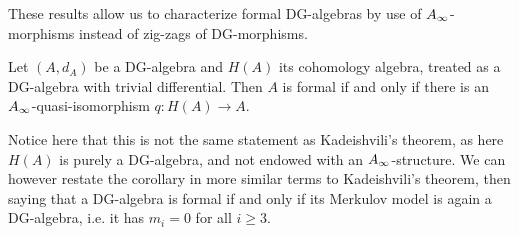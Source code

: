 These results allow us to characterize formal DG-algebras by use of $A_{\infty}$-morphisms instead of zig-zags of DG-morphisms. 


\begin{corollary}
\label{cor:formal_A_infinity-qi}
Let $(A, d_A)$ be a DG-algebra and $H(A)$ its cohomology algebra, treated as a DG-algebra with trivial differential. Then $A$ is formal if and only if there is an $A_{\infty}$-quasi-isomorphism $q\colon H(A)\longrightarrow A$. 
\end{corollary}

Notice here that this is not the same statement as Kadeishvili's theorem, as here $H(A)$ is purely a DG-algebra, and not endowed with an $A_{\infty}$-structure. We can however restate the corollary in more similar terms to Kadeishvili's theorem, then saying that a DG-algebra is formal if and only if its Merkulov model is again a DG-algebra, i.e. it has $m_i=0$ for all $i\geq 3$. 





